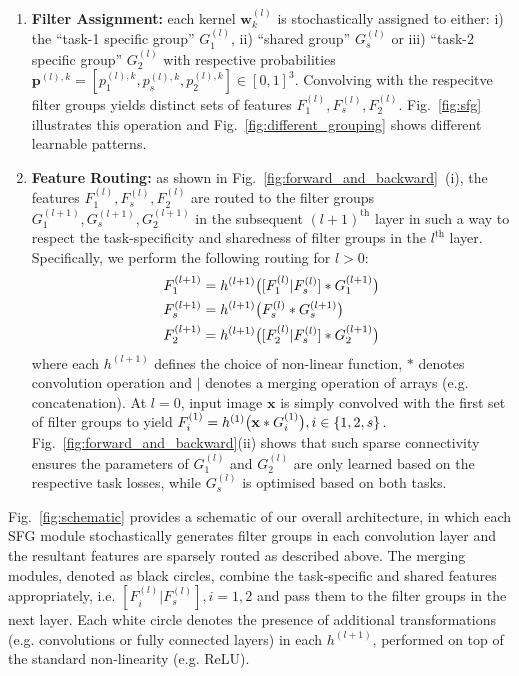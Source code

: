 \begin{enumerate}
    \item \textbf{Filter Assignment:} each kernel $\mathbf{w}_{k}^{(l)}$ is stochastically assigned to either: i) the ``task-1 specific group'' $G^{(l)}_{1}$, ii) ``shared group'' $G^{(l)}_{s}$ or iii) ``task-2 specific group'' $G^{(l)}_{2}$ with respective probabilities $\mathbf{p}^{(l),k} = [p^{(l),k}_1, p^{(l),k}_{s}, p^{(l),k}_2] \in [0,1]^3$. Convolving with the respecitve filter groups yields distinct sets of features $F^{(l)}_1, F^{(l)}_{s}, F^{(l)}_{2}$. Fig.~\ref{fig:sfg} illustrates this operation and Fig.~\ref{fig:different_grouping} shows different learnable patterns. 
    
    \item \textbf{Feature Routing:} as shown in Fig.~\ref{fig:forward_and_backward}~(i), the features $F^{(l)}_1, F^{(l)}_{s}, F^{(l)}_{2}$ are routed to the filter groups $G_{1}^{(l+1)}, G_{s}^{(l+1)}, G_{2}^{(l+1)}$ in the subsequent $(l+1)^{\text{th}}$ layer in such a way to respect the task-specificity and sharedness of filter groups in the $l^{\text{th}}$ layer. Specifically, we perform the following routing for $l>0$: 
        \begin{align*}
        F^{(l+1)}_1 &= h^{(l+1)}\big{(}[F^{(l)}_1|F^{(l)}_{s}]*G^{(l+1)}_{1}\big{)}\\ 
        F^{(l+1)}_{s} &= h^{(l+1)}\big{(} F^{(l)}_{s}*G^{(l+1)}_{s}\big{)}\\ 
        F^{(l+1)}_2 &= h^{(l+1)}\big{(}[F^{(l)}_2|F^{(l)}_{s}]*G^{(l+1)}_{2}\big{)}
        \end{align*}
    where each $h^{(l+1)}$ defines the choice of non-linear function, $*$ denotes convolution operation and $|$ denotes a merging operation of arrays (e.g. concatenation). At $l=0$, input image $\mathbf{x}$ is simply convolved with the first set of filter groups to yield $F^{(1)}_{i} = h^{(1)}\big{(}\mathbf{x}*G^{(1)}_{i}\big{)}, i\in\{1,2,s\}$. Fig.~\ref{fig:forward_and_backward}(ii) shows that such sparse connectivity ensures the parameters of $G^{(l)}_{1}$ and $G^{(l)}_{2}$ are only learned based on the respective task losses, while $G^{(l)}_{s}$ is optimised based on both tasks. 
\end{enumerate}
    
    
Fig.~\ref{fig:schematic} provides a schematic of our overall architecture, in which each SFG module stochastically generates filter groups in each convolution layer and the resultant features are sparsely routed as described above. The merging modules, denoted as black circles, combine the task-specific and shared features appropriately, i.e. $[F^{(l)}_{i}|F^{(l)}_{s}], i = 1,2$ and pass them to the filter groups in the next layer. Each white circle denotes the presence of additional transformations  (e.g. convolutions or fully connected layers) in each $h^{(l+1)}$, performed on top of the standard non-linearity (e.g. ReLU). 

